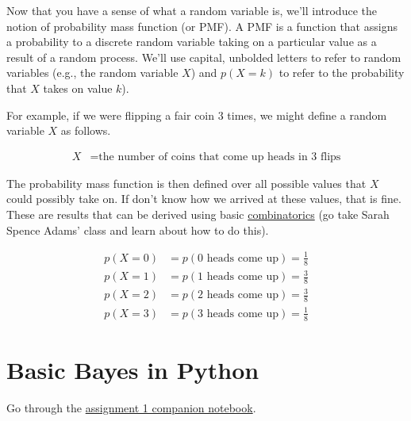 \documentclass[assignment01_Solutions]{subfiles}
\begin{document}
Now that you have a sense of what a random variable is, we'll introduce the notion of probability mass function (or PMF).  A PMF is a function that assigns a probability to a discrete random variable taking on a particular value as a result of a random process.  We'll use capital, unbolded letters to refer to random variables (e.g., the random variable $X$) and $p(X = k)$ to refer to the probability that $X$ takes on value $k$).

For example, if we were flipping a fair coin 3 times, we might define a random variable $X$ as follows.

\begin{align}
X&= \mbox{the number of coins that come up heads in 3 flips}
\end{align}

The probability mass function is then defined over all possible values that $X$ could possibly take on.  If don't know how we arrived at these values, that is fine.  These are results that can be derived using basic \href{https://en.wikipedia.org/wiki/Combinatorics}{combinatorics} (go take Sarah Spence Adams' class and learn about how to do this).

\begin{align}
p(X=0) &= p(\mbox{0 heads come up}) = \frac{1}{8} \nonumber \\
p(X=1) &= p(\mbox{1 heads come up}) = \frac{3}{8} \nonumber \\
p(X=2) &= p(\mbox{2 heads come up}) = \frac{3}{8} \nonumber \\
p(X=3) &= p(\mbox{3 heads come up}) = \frac{1}{8} \nonumber 
\end{align}


\section{Basic Bayes in Python}
\begin{externalresources}[(30 minutes)]
Go through the \href{https://colab.research.google.com/github/mlfa19/assignments/blob/master/Module\%202/01/Assignment_1_Companion_Notebook.ipynb}{assignment 1 companion notebook}.
\end{externalresources}
\end{document}
